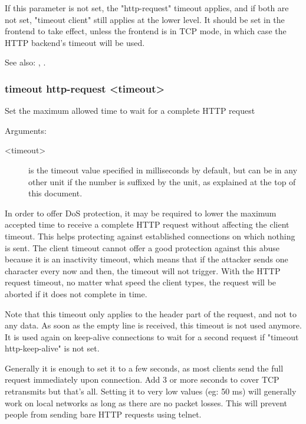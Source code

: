   If this parameter is not set, the "http-request" timeout applies, and if both
  are not set, "timeout client" still applies at the lower level. It should be
  set in the frontend to take effect, unless the frontend is in TCP mode, in
  which case the HTTP backend's timeout will be used.

  See also: , .


\subsubsection[timeout http-request]{timeout http-request <timeout>}


  Set the maximum allowed time to wait for a complete HTTP request


  Arguments:
  \begin{description}
  \item[<timeout>] is the timeout value specified in milliseconds by default, but
              can be in any other unit if the number is suffixed by the unit,
              as explained at the top of this document.
  \end{description}

  In order to offer DoS protection, it may be required to lower the maximum
  accepted time to receive a complete HTTP request without affecting the client
  timeout. This helps protecting against established connections on which
  nothing is sent. The client timeout cannot offer a good protection against
  this abuse because it is an inactivity timeout, which means that if the
  attacker sends one character every now and then, the timeout will not
  trigger. With the HTTP request timeout, no matter what speed the client
  types, the request will be aborted if it does not complete in time.

  Note that this timeout only applies to the header part of the request, and
  not to any data. As soon as the empty line is received, this timeout is not
  used anymore. It is used again on keep-alive connections to wait for a second
  request if "timeout http-keep-alive" is not set.

  Generally it is enough to set it to a few seconds, as most clients send the
  full request immediately upon connection. Add 3 or more seconds to cover TCP
  retransmits but that's all. Setting it to very low values (eg: 50 ms) will
  generally work on local networks as long as there are no packet losses. This
  will prevent people from sending bare HTTP requests using telnet.

